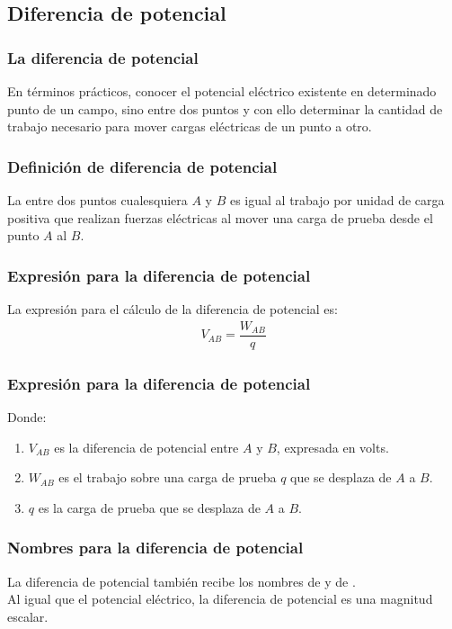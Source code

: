\documentclass[14pt]{beamer}
\begin{document}
\subsection{Diferencia de potencial}

\begin{frame}
\frametitle{La diferencia de potencial}
En términos prácticos,  conocer el potencial eléctrico existente en determinado punto de un campo, \pause sino  entre dos puntos \pause y con ello determinar la cantidad de trabajo necesario para mover cargas eléctricas de un punto a otro.
\end{frame}
\begin{frame}
\frametitle{Definición de diferencia de potencial}
La  entre dos puntos cualesquiera $A$ y $B$ \pause es igual al trabajo por unidad de carga positiva que realizan fuerzas eléctricas al mover una carga de prueba desde el punto $A$ al $B$.
\end{frame}
\begin{frame}
\frametitle{Expresión para la diferencia de potencial}
La expresión para el cálculo de la diferencia de potencial es:
\pause
\begin{align*}
V_{AB} = \dfrac{W_{AB}}{q}
\end{align*}
\end{frame}
\begin{frame}
\frametitle{Expresión para la diferencia de potencial}
Donde:
\begin{enumerate}[<+->]
\item $V_{AB}$ es la diferencia de potencial entre $A$ y $B$, expresada en volts.
\item $W_{AB}$ es el trabajo sobre una carga de prueba $q$ que se desplaza de $A$ a $B$.
\item $q$ es la carga de prueba que se desplaza de $A$ a $B$.
\end{enumerate}
\end{frame}
\begin{frame}
\frametitle{Nombres para la diferencia de potencial}
La diferencia de potencial también recibe los nombres de  y de .
\\
\bigskip
\pause
Al igual que el potencial eléctrico, la diferencia de potencial es una magnitud escalar.
\end{frame}
\end{document}

